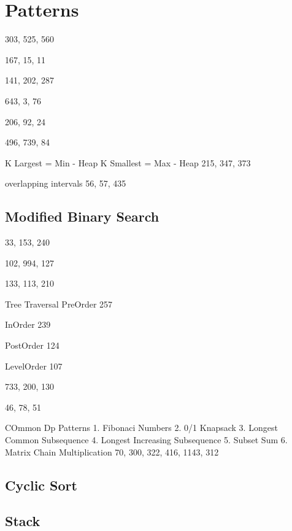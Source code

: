 \chapter{Patterns}

303, 525, 560





167, 15, 11



141, 202, 287


643, 3, 76


206, 92, 24


496, 739, 84



K Largest = Min - Heap
K Smallest = Max - Heap
215, 347, 373



overlapping intervals
56, 57, 435

\section{Modified Binary Search}

33, 153, 240



102, 994, 127


133, 113, 210

 Tree Traversal
PreOrder
257

InOrder
239

PostOrder
124

LevelOrder
107



733, 200, 130



46, 78, 51


COmmon Dp Patterns
1. Fibonaci Numbers
2. 0/1 Knapsack
3. Longest Common Subsequence
4. Longest Increasing Subsequence
5. Subset Sum
6. Matrix Chain Multiplication
70, 300, 322, 416, 1143, 312

\section{Cyclic Sort}


\section{Stack}


